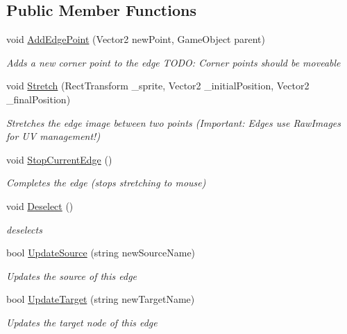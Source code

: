 \subsection*{Public Member Functions}
\begin{DoxyCompactItemize}
\item 
void \hyperlink{class_select_edge_button_a1feacae4681c9223e93212b399a45804}{Add\+Edge\+Point} (Vector2 new\+Point, Game\+Object parent)
\begin{DoxyCompactList}\small\item\em Adds a new corner point to the edge T\+O\+DO\+: Corner points should be moveable \end{DoxyCompactList}\item 
void \hyperlink{class_select_edge_button_adba216e2255a885ba68f71ab755050e6}{Stretch} (Rect\+Transform \+\_\+sprite, Vector2 \+\_\+initial\+Position, Vector2 \+\_\+final\+Position)
\begin{DoxyCompactList}\small\item\em Stretches the edge image between two points (Important\+: Edges use Raw\+Images for UV management!) \end{DoxyCompactList}\item 
void \hyperlink{class_select_edge_button_a95682addf9c0dc548bdbec0677295275}{Stop\+Current\+Edge} ()
\begin{DoxyCompactList}\small\item\em Completes the edge (stops stretching to mouse) \end{DoxyCompactList}\item 
void \hyperlink{class_select_edge_button_a2955591ac3928b72e096de918c98f9e4}{Deselect} ()
\begin{DoxyCompactList}\small\item\em deselects \end{DoxyCompactList}\item 
bool \hyperlink{class_select_edge_button_a2931dd33f05961306aba6cdf535a597a}{Update\+Source} (string new\+Source\+Name)
\begin{DoxyCompactList}\small\item\em Updates the source of this edge \end{DoxyCompactList}\item 
bool \hyperlink{class_select_edge_button_a3a394258288e816eb5c06e6608edad4a}{Update\+Target} (string new\+Target\+Name)
\begin{DoxyCompactList}\small\item\em Updates the target node of this edge \end{DoxyCompactList}\end{DoxyCompactItemize}
